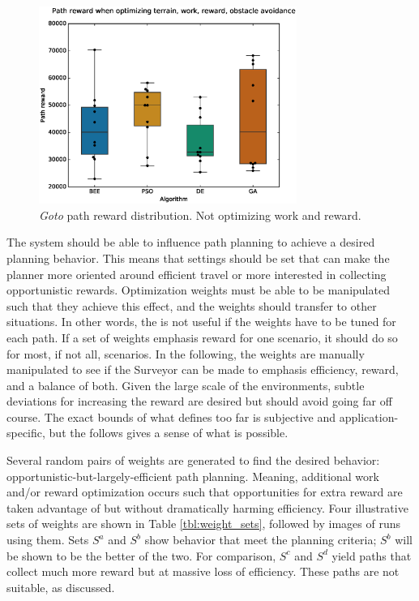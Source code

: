 \documentclass{tamuccthesis}
\begin{document}
\begin{figure}
    \captionsetup{justification=centering}
    \centering
    \includegraphics[width=0.75\textwidth,trim={0cm 0.75cm 0cm 0.75cm},clip]{EXP3_histo_reward_b.eps}
    \caption{\textit{Goto} path reward distribution. Not optimizing work and reward. }
    \label{fig:algcompare_b_reward}
\end{figure}


The system should be able to influence path planning to achieve a desired planning behavior. This means that settings should be set that can make the planner more oriented around efficient travel or more interested in collecting opportunistic rewards. Optimization weights must be able to be manipulated such that they achieve this effect, and the weights should transfer to other situations. In other words, the is not useful if the weights have to be tuned for each path. If a set of weights emphasis reward for one scenario, it should do so for most, if not all, scenarios. In the following, the weights are manually manipulated to see if the Surveyor can be made to emphasis efficiency, reward, and a balance of both. Given the large scale of the environments, subtle deviations for increasing the reward are desired but should avoid going far off course. The exact bounds of what defines too far is subjective and application-specific, but the follows gives a sense of what is possible. 

Several random pairs of weights are generated to find the desired behavior: opportunistic-but-largely-efficient path planning. Meaning, additional work and/or reward optimization occurs such that opportunities for extra reward are taken advantage of but without dramatically harming efficiency. Four illustrative sets of weights are shown in Table \ref{tbl:weight_sets}, followed by images of runs using them. Sets $S^a$ and $S^b$ show behavior that meet the planning criteria; $S^b$ will be shown to be the better of the two. For comparison, $S^c$ and $S^d$ yield paths that collect much more reward but at massive loss of efficiency. These paths are not suitable, as discussed. 
\end{document}

